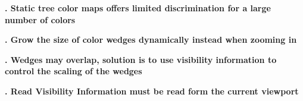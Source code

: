 \documentclass[review,journal]{vgtc}         %
\begin{document}
\textbf{. Static tree color maps offers limited discrimination for a large number of colors}


\textbf{. Grow the size of color wedges dynamically instead when zooming in}


\textbf{. Wedges may overlap, solution is to use visibility information to control the scaling of the wedges}


\textbf{. Read Visibility Information must be read form the current viewport}

\end{document}

